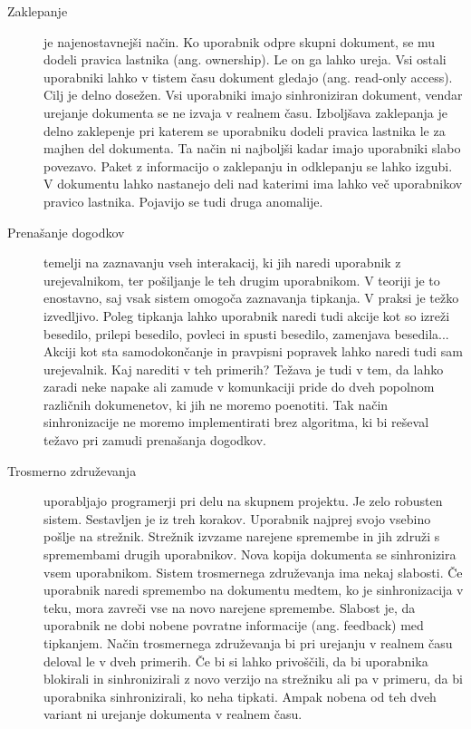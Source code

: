 \documentclass[a4paper, 12pt, twoside]{book}
\begin{document}
\begin{description}
	\item[Zaklepanje] je najenostavnejši način. Ko uporabnik odpre skupni dokument, se mu dodeli pravica lastnika (ang. ownership). Le on ga lahko ureja. Vsi ostali uporabniki lahko v tistem času dokument gledajo (ang. read-only access). Cilj je delno dosežen. Vsi uporabniki imajo sinhroniziran dokument, vendar urejanje dokumenta se ne izvaja v realnem času. Izboljšava zaklepanja je delno zaklepenje pri katerem se uporabniku dodeli pravica lastnika le za majhen del dokumenta. Ta način ni najboljši kadar imajo uporabniki slabo povezavo. Paket z informacijo o zaklepanju in odklepanju se lahko izgubi. V dokumentu lahko nastanejo deli nad katerimi ima lahko več uporabnikov pravico lastnika. Pojavijo se tudi druga anomalije.
	\item[Prenašanje dogodkov] temelji na zaznavanju vseh interakacij, ki jih naredi uporabnik z urejevalnikom, ter pošiljanje le teh drugim uporabnikom. V teoriji je to enostavno, saj vsak sistem omogoča zaznavanja tipkanja. V praksi je težko izvedljivo. Poleg tipkanja lahko uporabnik naredi tudi akcije kot so izreži besedilo, prilepi besedilo, povleci in spusti besedilo, zamenjava besedila... Akciji kot sta samodokončanje in pravpisni popravek lahko naredi tudi sam urejevalnik. Kaj narediti v teh primerih? Težava je tudi v tem, da lahko zaradi neke napake ali zamude v komunkaciji pride do dveh popolnom različnih dokumenetov, ki jih ne moremo poenotiti. Tak način sinhronizacije ne moremo implementirati brez algoritma, ki bi reševal težavo pri zamudi prenašanja dogodkov.
	\item[Trosmerno združevanja] uporabljajo programerji pri delu na skupnem projektu. Je zelo robusten sistem. Sestavljen je iz treh korakov. Uporabnik najprej svojo vsebino pošlje na strežnik. Strežnik izvzame narejene spremembe in jih združi s spremembami drugih uporabnikov. Nova kopija dokumenta se sinhronizira vsem uporabnikom. Sistem trosmernega združevanja ima nekaj slabosti. Če uporabnik naredi spremembo na dokumentu medtem, ko je sinhronizacija v teku, mora zavreči vse na novo narejene spremembe. Slabost je, da uporabnik ne dobi nobene povratne informacije (ang. feedback) med tipkanjem. Način trosmernega združevanja bi pri urejanju v realnem času deloval le v dveh primerih. Če bi si lahko privoščili, da bi uporabnika blokirali in sinhronizirali z novo verzijo na strežniku ali pa v primeru, da bi uporabnika sinhronizirali, ko neha tipkati. Ampak nobena od teh dveh variant ni urejanje dokumenta v realnem času.
\end{description}
\end{document}
